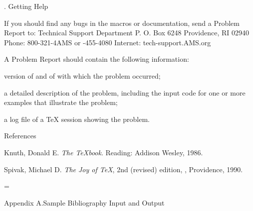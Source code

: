 . Getting Help
\endhead

If you should find any bugs in the macros or documentation,
send a Problem Report to:
\beginexample{\rm}
Technical Support Department
\AMS{}
P. O. Box 6248
Providence, RI 02940
\vskip 2pt %
Phone: 800-321-4AMS \quad or -455-4080
Internet: tech-support\@Math.AMS.org
\endexample

A Problem Report should contain the following information:
\roster
\item version of  and of  with which
  the problem occurred;
\item a detailed description of the problem, including the input code for
  one or more examples that illustrate the problem;
\item a log file of a \TeX{} session showing the problem.
\endroster

\head References\endhead

\noindent{} Knuth, Donald E. {\it The \TeX{}book}. Reading:
Addison Wesley, 1986.

\noindent{} Spivak, Michael D. {\it The Joy of \TeX{}},
2nd (revised) edition, \AMS{}, Providence, 1990.



\newpage


\begingroup %

\vfuzz=1pt

\newdimen\headlinewidth
\headlinewidth=\hsize
\def\makeheadline{\vbox to0pt{\vskip-22.5pt
  \hbox to\headlinewidth{\vbox to8.5pt{}\the\headline}\vss}\nointerlineskip}

\head Appendix A.\quad Sample Bibliography Input and Output
\endhead

\pageheight{30pc}


